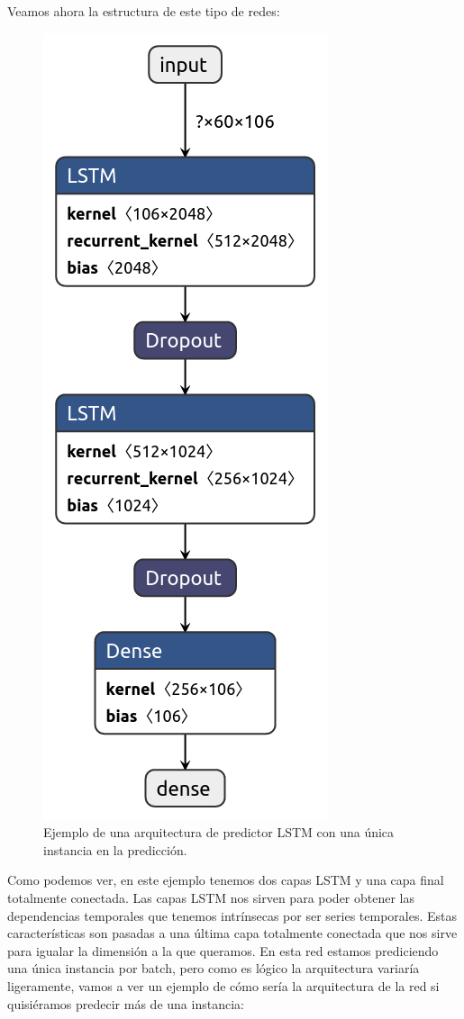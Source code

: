 Veamos ahora la estructura de este tipo de redes:

\begin{figure}[H]
	\centering
	\includegraphics[scale=0.4]{imagenes/lstm-forecaster.png}
	\caption{Ejemplo de una arquitectura de predictor LSTM con una única instancia en la predicción.}
	\label{img:forecaster-lstm}
\end{figure}

Como podemos ver, en este ejemplo tenemos dos capas LSTM y una capa final totalmente conectada. Las capas LSTM nos sirven para poder obtener las dependencias temporales que tenemos intrínsecas por ser series temporales. Estas características son pasadas a una última capa totalmente conectada que nos sirve para igualar la dimensión a la que queramos. En esta red estamos prediciendo una única instancia por batch, pero como es lógico la arquitectura variaría ligeramente, vamos a ver un ejemplo de cómo sería la arquitectura de la red si quisiéramos predecir más de una instancia:

